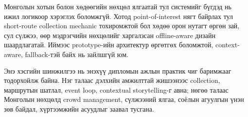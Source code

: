 \begin{sloppy}
Монголын хотын болон хөдөөгийн нөхцөл ялгаатай тул системийг бүгдэд нь ижил логикоор хэрэглэх боломжгүй. Хотод point-of-interest нягт байрлах тул short-route collection mechanic тохиромжтой бол хөдөө орон нутагт өргөн зай, сул сүлжээ, өөр мэдрэгчийн нөхцөлийг харгалзсан offline-aware дизайн шаардлагатай. Иймээс prototype-ийн архитектур өргөтгөх боломжтой, context-aware, fallback-тэй байх нь зайлшгүй юм.

Энэ хэсгийн шинжилгээ нь энэхүү дипломын ажлын практик чиг баримжааг тодорхойлж байна. Нэг талаас дэлхийн амжилттай жишээнээс collection, маршрутын шатлал, event loop, contextual storytelling-г авна; нөгөө талаас Монголын нөхцөлд crowd management, сүлжээний ялгаа, соёлын агуулгын үнэн зөв байдал, хүртээмжийн асуудлыг заавал тусгана.

\end{sloppy}


